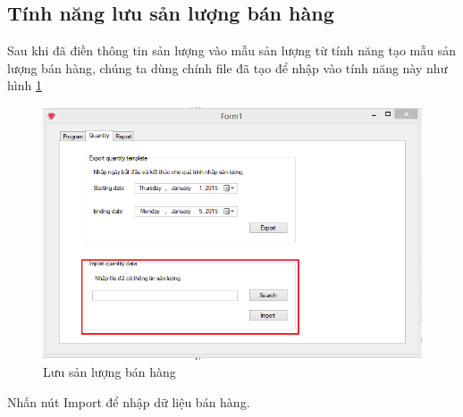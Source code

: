 \documentclass[11pt]{article}
\begin{document}
\subsection{Tính năng lưu sản lượng bán hàng}
\indent Sau khi đã điền thông tin sản lượng vào mẫu sản lượng từ tính năng tạo mẫu sản lượng bán hàng, chúng ta dùng chính file đã tạo để nhập vào tính năng này như hình \ref{imquantity}
\begin{figure}[h!]
	\begin{center}
		\includegraphics[width=15cm]{imquantity.png}
	\end{center}
	\caption{Lưu sản lượng bán hàng}
	\label{imquantity}
\end{figure}
\indent Nhấn nút Import để nhập dữ liệu bán hàng.
\end{document}
